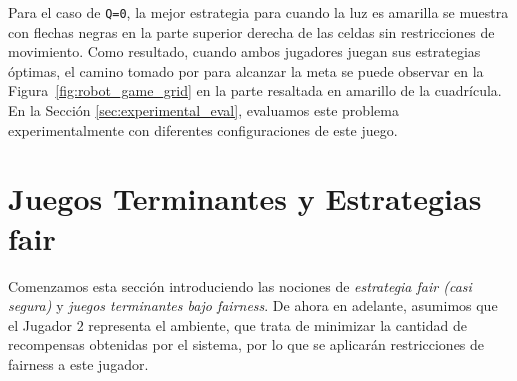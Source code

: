 Para el caso de \texttt{Q=0}, la mejor estrategia para \roborta cuando la luz es amarilla se muestra con flechas negras en la parte superior derecha de las celdas sin restricciones de movimiento.
Como resultado, cuando ambos jugadores juegan sus estrategias óptimas, el camino tomado por \roborta para alcanzar la meta se puede observar en la Figura~\ref{fig:robot_game_grid} en la parte resaltada en amarillo de la cuadrícula. En la Sección \ref{sec:experimental_eval}, evaluamos este problema experimentalmente con diferentes
configuraciones de este juego.




\section{Juegos Terminantes y Estrategias fair}\label{sec:fair-strats}

Comenzamos esta sección introduciendo las nociones de \emph{estrategia fair (casi segura)} y \emph{juegos terminantes bajo fairness}. 
De ahora en adelante, asumimos que el Jugador $2$ representa el ambiente, que trata de minimizar la cantidad de recompensas obtenidas por el sistema, por lo que se aplicarán restricciones de fairness a este jugador.

